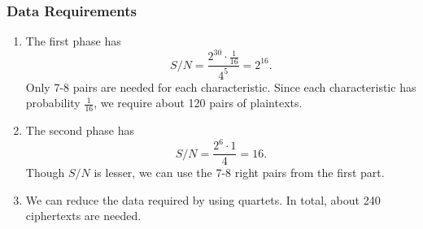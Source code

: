 \documentclass{beamer}
\begin{document}
	\begin{frame}
		\frametitle{Data Requirements}
		\begin{enumerate}
			\item The first phase has
			\begin{equation}
				S/N = \frac{2^{30} \cdot \frac{1}{16}}{4^5} = 2^{16}.
			\end{equation}
			Only 7-8 pairs are needed for each characteristic. Since each
			characteristic has probability \(\frac{1}{16}\), we require about
			120 pairs of plaintexts.
			\item The second phase has
			\begin{equation}
				S/N = \frac{2^6 \cdot 1}{4} = 16.
			\end{equation}
			Though \(S/N\) is lesser, we can use the 7-8 right pairs from the
			first part.
			\item We can reduce the data required by using quartets. In total,
			about 240 ciphertexts are needed. 
		\end{enumerate}
	\end{frame}
\end{document}
